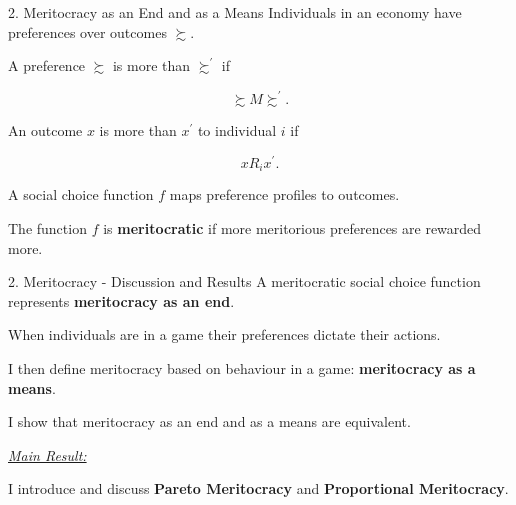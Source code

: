 \documentclass[usenames,dvipsnames,aspectratio=169,11pt]{beamer}
\begin{document}
\begin{frame}{2. Meritocracy as an End and as a Means}
	Individuals in an economy have preferences over outcomes \( \succsim \). \pause

	\vfill

	A preference \( \succsim \) is more  than \( \succsim^{\prime} \) if

	\[ \succsim M \succsim^{\prime} . \] \pause

	An outcome \( x \) is more  than \( x^{\prime} \) to individual \( i \) if

	\[ x R_i x^{\prime} .\] \pause

	A social choice function \( f \) maps preference profiles to outcomes. \pause

	\vfill

	The function \( f \) is \textbf{meritocratic} if more meritorious preferences are rewarded more.

\end{frame}

\begin{frame}{2. Meritocracy - Discussion and Results}
	A meritocratic social choice function represents \textbf{meritocracy as an end}. \pause

	\vfill

	When individuals are in a game their preferences dictate their actions.

	\vfill

	I then define meritocracy based on behaviour in a game: \textbf{meritocracy as a means}. \pause

	\vfill

	I show that meritocracy as an end and as a means are equivalent. \pause
	\vfill

	\underline{\textit{Main Result:}}

	I introduce and discuss \textbf{Pareto Meritocracy} and \textbf{Proportional Meritocracy}.

\end{frame}
\end{document}
